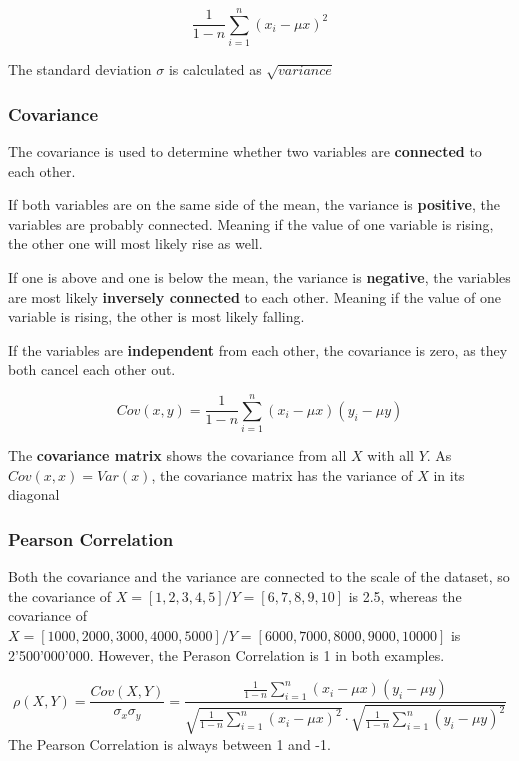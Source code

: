 \documentclass[a4paper, 11pt]{article}
\begin{document}
\begin{equation}
	\frac{1}{1-n} \sum^{n}_{i=1}(x_{i} - \mu x)^2
\end{equation}

The standard deviation $\sigma$ is calculated as $\sqrt{variance}$

\newpage

\subsubsection{Covariance}
The covariance is used to determine whether two variables are \textbf{connected} to each other. 

If both variables are on the same side of the mean, the variance is \textbf{positive}, the variables are probably connected. Meaning if the value of one variable is rising, the other one will most likely rise as well. 

If one is above and one is below the mean, the variance is \textbf{negative}, the variables are most likely \textbf{inversely connected} to each other. Meaning if the value of one variable is rising, the other is most likely falling.

If the variables are \textbf{independent} from each other, the covariance is zero, as they both cancel each other out.

\begin{equation}
	Cov(x,y) = \frac{1}{1-n} \sum^{n}_{i=1}(x_{i} - \mu x)(y_{i} - \mu y)
\end{equation}

The \textbf{covariance matrix} shows the covariance from all $X$ with all $Y$. As $Cov(x,x) = Var(x)$, the covariance matrix has the variance of $X$ in its diagonal


\subsubsection{Pearson Correlation} \label{sec:pearson}
Both the covariance and the variance are connected to the scale of the dataset, so the covariance of $X=[1,2,3,4,5] / Y=[6,7,8,9,10]$ is 2.5, whereas the covariance of $X=[1000,2000,3000,4000,5000] / Y=[6000,7000,8000,9000,10000]$ is 2'500'000'000. However, the Perason Correlation is 1 in both examples.

\begin{equation}
	\rho(X,Y)=\frac{Cov(X,Y)}{\sigma_{x} \sigma_{y}} = 
	        \frac{\frac{1}{1-n} \sum^{n}_{i=1}(x_{i} - \mu x)(y_{i} - \mu y)}{\sqrt{\frac{1}{1-n} \sum^{n}_{i=1}(x_{i} - \mu x)^2} \cdot \sqrt{\frac{1}{1-n} \sum^{n}_{i=1}(y_{i} - \mu y)^2}}
\end{equation}
The Pearson Correlation is always between 1 and -1. 
\end{document}
